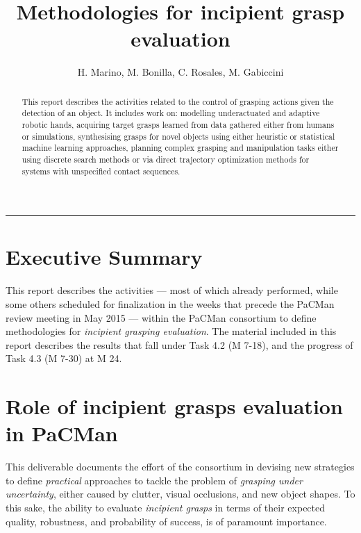 \documentclass[a4paper,11pt,pdf]{pacmanreport}
\title{Methodologies for incipient grasp evaluation}
\author{H. Marino, M. Bonilla, C. Rosales, M. Gabiccini}
\begin{document}
\maketitle

\begin{abstract}
\noindent This report describes the activities related to the control of grasping actions given the detection of an object. It includes work on: modelling underactuated and adaptive robotic hands, acquiring target grasps learned from data gathered either from humans or simulations, synthesising grasps for novel objects using either heuristic or statistical machine learning approaches, planning complex grasping and manipulation tasks either using discrete search methods or via direct trajectory optimization methods for systems with unspecified contact sequences.
\end{abstract}


\vspace{.2em}
\hrule

\footnotesize

\tableofcontents

\normalsize

\newpage

\section*{Executive Summary}

This report describes the activities --- most of which already performed, while some others scheduled for finalization in the weeks that precede the PaCMan review meeting in May 2015 --- within the PaCMan consortium to define methodologies for \emph{incipient grasping evaluation}. The material included in this report describes the results that fall under Task 4.2 (M 7-18), and the progress of Task 4.3 (M 7-30) at M 24.

\section*{Role of incipient grasps evaluation in PaCMan}

This deliverable documents the effort of the consortium in devising new strategies to define \emph{practical} approaches to tackle the problem of \emph{grasping under uncertainty}, either caused by clutter, visual occlusions, and new object shapes. To this sake, the ability to evaluate \emph{incipient grasps} in terms of their expected quality, robustness, and probability of success, is of paramount importance.
\end{document}
